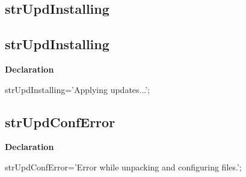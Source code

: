 \documentclass{report}
\newif\ifpdf
\begin{document}
\subsection*{\large{\textbf{strUpdInstalling}}\normalsize\hspace{1ex}\hrulefill}
\else
\subsection*{strUpdInstalling}
\fi
\label{trstrings-strUpdInstalling}
\begin{list}{}{
\setlength{\itemindent}{0cm}
\setlength{\listparindent}{0cm}
\setlength{\leftmargin}{\evensidemargin}
\addtolength{\leftmargin}{\tmplength}
\settowidth{\labelsep}{X}
\addtolength{\leftmargin}{\labelsep}
\setlength{\labelwidth}{\tmplength}
}
\item[\textbf{Declaration}\hfill]
\ifpdf
\begin{flushleft}
\fi
\begin{ttfamily}
strUpdInstalling='Applying updates...';\end{ttfamily}

\ifpdf
\end{flushleft}
\fi

\end{list}
\ifpdf
\subsection*{\large{\textbf{strUpdConfError}}\normalsize\hspace{1ex}\hrulefill}
\else
\subsection*{strUpdConfError}
\fi
\label{trstrings-strUpdConfError}
\begin{list}{}{
\setlength{\itemindent}{0cm}
\setlength{\listparindent}{0cm}
\setlength{\leftmargin}{\evensidemargin}
\addtolength{\leftmargin}{\tmplength}
\settowidth{\labelsep}{X}
\addtolength{\leftmargin}{\labelsep}
\setlength{\labelwidth}{\tmplength}
}
\item[\textbf{Declaration}\hfill]
\ifpdf
\begin{flushleft}
\fi
\begin{ttfamily}
strUpdConfError='Error while unpacking and configuring files.';\end{ttfamily}

\ifpdf
\end{flushleft}
\fi

\end{list}
\end{document}
